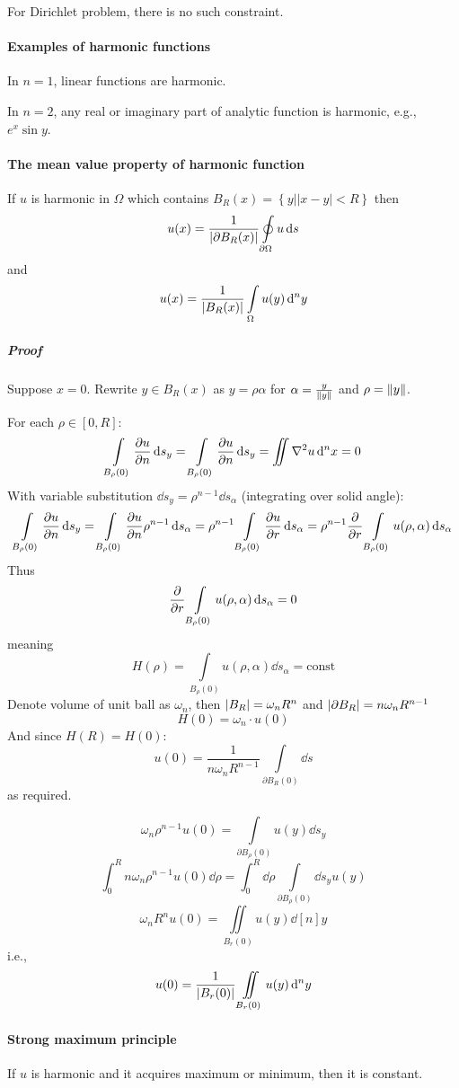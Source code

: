 For Dirichlet problem, there is no such constraint.

\paragraph{Examples of harmonic functions}
In $n=1$, linear functions are harmonic.

In $n=2$, any real or imaginary part of analytic function is harmonic, e.g., $e^x \sin y$.
\paragraph{The mean value property of harmonic function}
If $u$ is harmonic in $\Omega$ which contains $B_R(x) = \left\{ y| |x-y|<R \right\}$
then
$$u(x) = \frac{1}{\abs{\partial B_R(x)}} \oint\limits_{\partial \Omega} u \dd{s} $$
and
$$u(x) = \frac{1}{\abs{ B_R(x)}} \int\limits_{\Omega} u(y) \dd[n]{y} $$
\subparagraph{Proof}
Suppose $x=0$.
Rewrite $y\in B_R(x) $ as $y=\rho\alpha$ for $\alpha= \frac{y}{\norm{y}}$ and $\rho = \norm{y}$.

For each $\rho\in [0,R]$:
$$\int\limits_{B_\rho(0)} \pdv{u}{n} (\rho\alpha) \dd{s_y}=\int\limits_{B_\rho(0)} \pdv{u}{n} (y) \dd{s_y} = \iint \laplacian{u} \dd[n]{x} = 0$$
With variable substitution $\dd{s_y} = \rho^{n-1}\dd{s_\alpha}$ (integrating over solid angle):
$$\int\limits_{B_\rho(0)} \pdv{u}{n} (\rho\alpha) \dd{s_y}=\int\limits_{B_\rho(0)} \pdv{u}{n} (\rho\alpha) \rho^{n-1} \dd{s_\alpha}=\rho^{n-1} \int\limits_{B_\rho(0)} \pdv{u}{r} (\rho,\alpha)  \dd{s_\alpha} = \rho^{n-1}  \pdv{r} \int\limits_{B_\rho(0)}  u(\rho,\alpha)  \dd{s_\alpha}$$
Thus
$$\pdv{r} \int\limits_{B_\rho(0)}  u(\rho,\alpha)  \dd{s_\alpha} = 0$$
meaning
$$H(\rho) = \int\limits_{B_\rho(0)}  u(\rho,\alpha)  \dd{s_\alpha} = \text{const}$$
Denote volume of unit ball as $\omega_n$, then $\abs{B_R} = \omega_n R^n$ and $\abs{\partial B_R} = n\omega_{n}R^{n-1}$ 
$$H(0) = \omega_n \cdot u(0)$$
And since $H(R) = H(0)$:
$$u(0) = \frac{1}{n\omega_n R^{n-1}} \int\limits_{\partial B_R(0)} \dd{s}$$
as required.

$$\omega_n \rho^{n-1} u(0) = \int\limits_{\partial B_\rho(0)} u(y) \dd{s_y}$$
$$\int_0^R n \omega_n \rho^{n-1} u(0) \dd{\rho} = \int_0^R \dd{\rho} \int\limits_{\partial B_\rho(0)}  \dd{s_y} u(y)$$
$$\omega_n R^n u(0) = \iint\limits_{B_r(0)} u(y) \dd[n]{y}$$
i.e.,
$$u(0) = \frac{1}{\abs{B_r(0)}} \iint\limits_{B_r(0)} u(y) \dd[n]{y}$$
	\paragraph{Strong maximum principle }
	If $u$ is harmonic and it acquires maximum or minimum, then it is constant.
